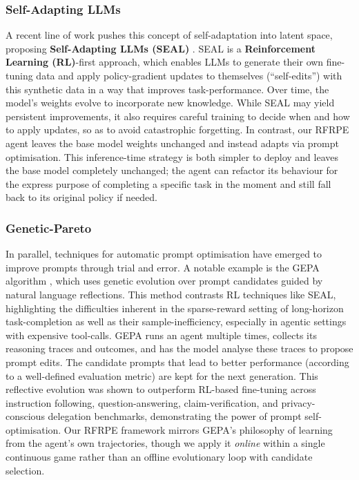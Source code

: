 \documentclass[11pt]{article}
\begin{document}
\subsubsection{Self-Adapting LLMs}
A recent line of work pushes this concept of self-adaptation into latent space, proposing \textbf{Self-Adapting LLMs (SEAL)} \citep{zweiger2025seal}. SEAL is a \textbf{Reinforcement Learning (RL)}-first approach, which enables LLMs to generate their own fine-tuning data and apply policy-gradient updates to themselves (“self-edits”) with this synthetic data in a way that improves task-performance. Over time, the model’s weights evolve to incorporate new knowledge. While SEAL may yield persistent improvements, it also requires careful training to decide when and how to apply updates, so as to avoid catastrophic forgetting. In contrast, our RFRPE agent leaves the base model weights unchanged and instead adapts via prompt optimisation. This inference-time strategy is both simpler to deploy and leaves the base model completely unchanged; the agent can refactor its behaviour for the express purpose of completing a specific task in the moment and still fall back to its original policy if needed.


\subsubsection{Genetic-Pareto}
In parallel, techniques for automatic prompt optimisation have emerged to improve prompts through trial and error. A notable example is the GEPA algorithm \citep{agrawal2025gepa}, which uses genetic evolution over prompt candidates guided by natural language reflections. This method contrasts RL techniques like SEAL, highlighting the difficulties inherent in the sparse-reward setting of long-horizon task-completion as well as their sample-inefficiency, especially in agentic settings with expensive tool-calls. GEPA runs an agent multiple times, collects its reasoning traces and outcomes, and has the model analyse these traces to propose prompt edits. The candidate prompts that lead to better performance (according to a well-defined evaluation metric) are kept for the next generation. This reflective evolution was shown to outperform RL-based fine-tuning across instruction following, question-answering, claim-verification, and privacy-conscious delegation benchmarks, demonstrating the power of prompt self-optimisation. Our RFRPE framework mirrors GEPA’s philosophy of learning from the agent’s own trajectories, though we apply it \emph{online} within a single continuous game rather than an offline evolutionary loop with candidate selection.
\end{document}
